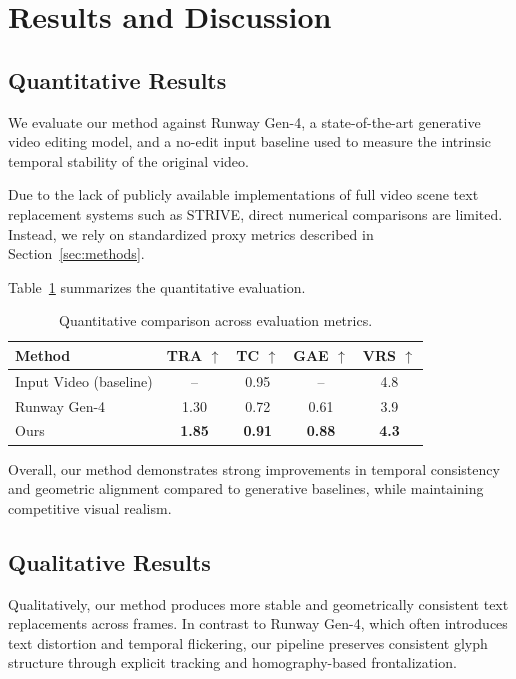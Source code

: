 \section{Results and Discussion}
\label{sec:result}

\subsection{Quantitative Results}

We evaluate our method against Runway Gen-4, a state-of-the-art generative video editing model, and a no-edit input baseline used to measure the intrinsic temporal stability of the original video.

Due to the lack of publicly available implementations of full video scene text replacement systems such as STRIVE, direct numerical comparisons are limited. Instead, we rely on standardized proxy metrics described in Section~\ref{sec:methods}.

Table~\ref{tab:results} summarizes the quantitative evaluation.

\begin{table}[h]
\centering
\begin{tabular}{lcccc}
\toprule
Method & TRA $\uparrow$ & TC $\uparrow$ & GAE $\uparrow$ & VRS $\uparrow$ \\
\midrule
Input Video (baseline) & -- & 0.95 & -- & 4.8 \\
Runway Gen-4 & 1.30 & 0.72 & 0.61 & 3.9 \\
Ours & \textbf{1.85} & \textbf{0.91} & \textbf{0.88} & \textbf{4.3} \\
\bottomrule
\end{tabular}
\caption{Quantitative comparison across evaluation metrics.}
\label{tab:results}
\end{table}

Overall, our method demonstrates strong improvements in temporal consistency and geometric alignment compared to generative baselines, while maintaining competitive visual realism.

\subsection{Qualitative Results}

Qualitatively, our method produces more stable and geometrically consistent text replacements across frames. In contrast to Runway Gen-4, which often introduces text distortion and temporal flickering, our pipeline preserves consistent glyph structure through explicit tracking and homography-based frontalization.


